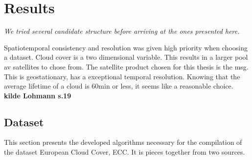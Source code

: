 \chapter{Results}
\textit{We tried several candidate structure before arriving at the ones presented here.}

 
Spatiotemporal consistency and resolution was given high priority when choosing a dataset. %
Cloud cover is a two dimensional variable. This results in a larger pool av satellites to chose from. The satellite product chosen for this thesis is the \acrfull{msg}. This is geostationary, has a exceptional temporal resolution. Knowing that the average lifetime of a cloud is 60min or less, it seems like a reasonable choice. \textbf{kilde Lohmann s.19}

\section{Dataset}
This section presents the developed algorithms necessary for the compilation of the dataset European Cloud Cover, ECC. It is pieces together from two sources.

